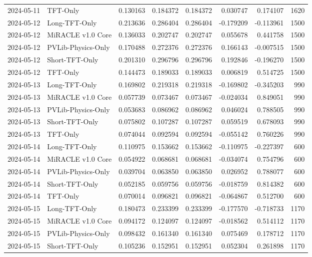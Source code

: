 \begin{tabular}{llrrrrrr}
2024-05-11 & TFT-Only & 0.130163 & 0.184372 & 0.184372 & 0.030747 & 0.174107 & 1620 \\
2024-05-12 & Long-TFT-Only & 0.213636 & 0.286404 & 0.286404 & -0.179209 & -0.113961 & 1500 \\
2024-05-12 & MiRACLE v1.0 Core & 0.136033 & 0.202747 & 0.202747 & 0.055678 & 0.441758 & 1500 \\
2024-05-12 & PVLib-Physics-Only & 0.170488 & 0.272376 & 0.272376 & 0.166143 & -0.007515 & 1500 \\
2024-05-12 & Short-TFT-Only & 0.201310 & 0.296796 & 0.296796 & 0.192846 & -0.196270 & 1500 \\
2024-05-12 & TFT-Only & 0.144473 & 0.189033 & 0.189033 & 0.006819 & 0.514725 & 1500 \\
2024-05-13 & Long-TFT-Only & 0.169802 & 0.219318 & 0.219318 & -0.169802 & -0.345203 & 990 \\
2024-05-13 & MiRACLE v1.0 Core & 0.057739 & 0.073467 & 0.073467 & -0.024034 & 0.849051 & 990 \\
2024-05-13 & PVLib-Physics-Only & 0.053683 & 0.086962 & 0.086962 & 0.046024 & 0.788505 & 990 \\
2024-05-13 & Short-TFT-Only & 0.075802 & 0.107287 & 0.107287 & 0.059519 & 0.678093 & 990 \\
2024-05-13 & TFT-Only & 0.074044 & 0.092594 & 0.092594 & -0.055142 & 0.760226 & 990 \\
2024-05-14 & Long-TFT-Only & 0.110975 & 0.153662 & 0.153662 & -0.110975 & -0.227397 & 600 \\
2024-05-14 & MiRACLE v1.0 Core & 0.054922 & 0.068681 & 0.068681 & -0.034074 & 0.754796 & 600 \\
2024-05-14 & PVLib-Physics-Only & 0.039704 & 0.063850 & 0.063850 & 0.026952 & 0.788077 & 600 \\
2024-05-14 & Short-TFT-Only & 0.052185 & 0.059756 & 0.059756 & -0.018759 & 0.814382 & 600 \\
2024-05-14 & TFT-Only & 0.070014 & 0.096821 & 0.096821 & -0.064867 & 0.512700 & 600 \\
2024-05-15 & Long-TFT-Only & 0.180473 & 0.233399 & 0.233399 & -0.177570 & -0.718733 & 1170 \\
2024-05-15 & MiRACLE v1.0 Core & 0.094172 & 0.124097 & 0.124097 & -0.018562 & 0.514112 & 1170 \\
2024-05-15 & PVLib-Physics-Only & 0.098432 & 0.161340 & 0.161340 & 0.075469 & 0.178712 & 1170 \\
2024-05-15 & Short-TFT-Only & 0.105236 & 0.152951 & 0.152951 & 0.052304 & 0.261898 & 1170 \\

\end{tabular}
